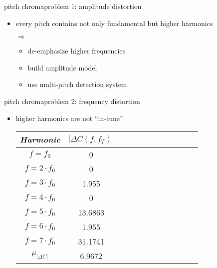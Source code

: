         
        \begin{frame}{pitch chroma}{problem 1: amplitude distortion}
            \vspace{-3mm}
            \begin{itemize}
                \item	every pitch contains not only fundamental but higher harmonics
                \item[$\Rightarrow$]
                    \begin{itemize}
                        \item<2->	[$\Rightarrow$]	de-emphasize higher frequencies
                        \item<2->	[$\Rightarrow$]	build amplitude model
                        \item<2->	[$\Rightarrow$]	use multi-pitch detection system
                    \end{itemize}
            \end{itemize}
        \end{frame}
        \begin{frame}{pitch chroma}{problem 2: frequency distortion}
            \begin{itemize}
                \item	higher harmonics are not ``in-tune''
                \begin{table}
                    \centering
                    \begin{tabular}{cccccccccccc} %
                        \\ \hline
                        \bf{\emph{Harmonic}}	 & \bf{\emph{$|\Delta C(f,f_T)|$}}\\ 
                         \hline
                        \bf{$f = f_0$}	 & 0\\
                        \bf{$f = 2\cdot f_0$}	 & 0\\
                        \bf{$f = 3\cdot f_0$}	 & 1.955\\
                        \bf{$f = 4\cdot f_0$}	 & 0\\
                        \bf{$f = 5\cdot f_0$}	 & 13.6863\\
                        \bf{$f = 6\cdot f_0$}	 & 1.955\\
                        \bf{$f = 7\cdot f_0$}	 & 31.1741\\
                        \hline
                        \bf{$\mu_{|\Delta C|}$}	 & 6.9672\\
                    \end{tabular}
                \end{table}
            \end{itemize}
        \end{frame}

